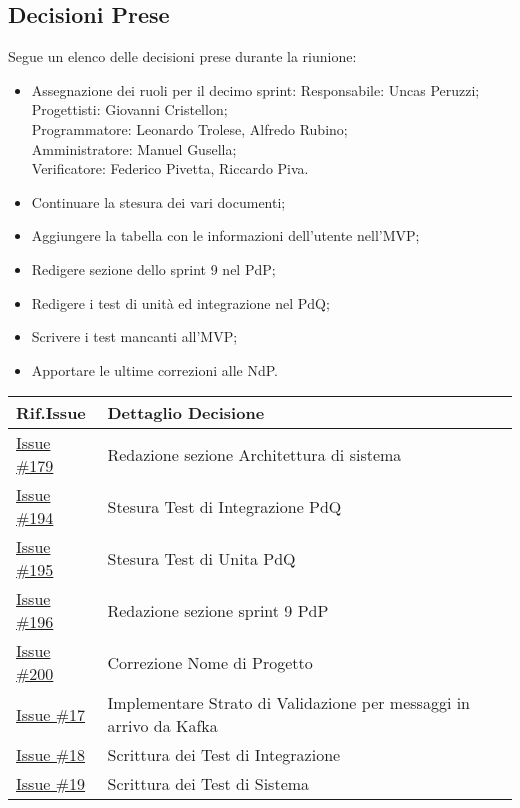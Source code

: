 \documentclass[10pt]{article}
\begin{document}
\subsection{Decisioni Prese}
Segue un elenco delle decisioni prese durante la riunione:
\begin{itemize}
    \item   Assegnazione dei ruoli per il decimo sprint:
            Responsabile: Uncas Peruzzi;\\
            Progettisti: Giovanni Cristellon;\\
            Programmatore: Leonardo Trolese, Alfredo Rubino;\\
            Amministratore: Manuel Gusella;\\
            Verificatore: Federico Pivetta, Riccardo Piva.
    \item Continuare la stesura dei vari documenti;
    \item Aggiungere la tabella con le informazioni dell'utente nell'MVP;
    \item Redigere sezione dello sprint 9 nel PdP;
    \item Redigere i test di unità ed integrazione nel PdQ;
    \item Scrivere i test mancanti all'MVP;
    \item Apportare le ultime correzioni alle NdP.
\end{itemize}

\begin{center}
    \begin{tabular}{|>{\centering\arraybackslash}m{3cm}|>{\centering\arraybackslash}m{12cm}|}
	\hline
	\textbf{Rif.Issue} & \textbf{Dettaglio Decisione}\\
	\hline  
            \href{https://github.com/SevenBitsSwe/7BitsDocs/issues/179}{Issue \#179} & Redazione sezione Architettura di sistema\\
        \hline
            \href{https://github.com/SevenBitsSwe/7BitsDocs/issues/194}{Issue \#194} & Stesura Test di Integrazione PdQ\\
        \hline
            \href{https://github.com/SevenBitsSwe/7BitsDocs/issues/195}{Issue \#195} & Stesura Test di Unita PdQ\\
        \hline
            \href{https://github.com/SevenBitsSwe/7BitsDocs/issues/196}{Issue \#196} & Redazione sezione sprint 9 PdP\\
        \hline
            \href{https://github.com/SevenBitsSwe/7BitsDocs/issues/200}{Issue \#200} & Correzione Nome di Progetto\\
        \hline
            \href{https://github.com/SevenBitsSwe/MVP/issues/17}{Issue \#17} & Implementare Strato di Validazione per messaggi in arrivo da Kafka\\
        \hline
            \href{https://github.com/SevenBitsSwe/MVP/issues/18}{Issue \#18} & Scrittura dei Test di Integrazione\\
        \hline
            \href{https://github.com/SevenBitsSwe/MVP/issues/19}{Issue \#19} & Scrittura dei Test di Sistema\\
        \hline
    \end{tabular}
\end{center}
\end{document}

